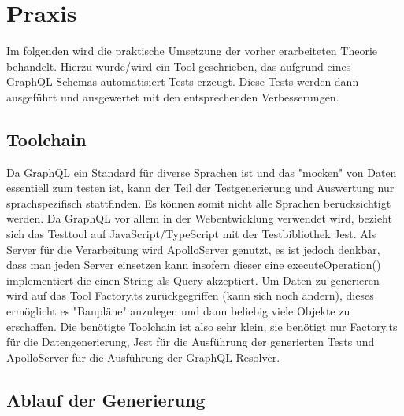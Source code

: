 \chapter{Praxis}

Im folgenden wird die praktische Umsetzung der vorher erarbeiteten Theorie behandelt.
Hierzu wurde/wird ein Tool geschrieben, das aufgrund eines GraphQL-Schemas automatisiert Tests erzeugt.
Diese Tests werden dann ausgeführt und ausgewertet mit den entsprechenden Verbesserungen.

\section{Toolchain}

Da GraphQL ein Standard für diverse Sprachen ist und das "mocken" von Daten essentiell zum testen ist, kann
der Teil der Testgenerierung und Auswertung nur sprachspezifisch stattfinden. Es können somit nicht alle
Sprachen berücksichtigt werden.
Da GraphQL vor allem in der Webentwicklung verwendet wird, bezieht sich das Testtool auf JavaScript/TypeScript
mit der Testbibliothek Jest.
Als Server für die Verarbeitung wird ApolloServer genutzt, es ist jedoch denkbar,
dass man jeden Server einsetzen kann insofern dieser eine executeOperation() implementiert die einen
String als Query akzeptiert.
Um Daten zu generieren wird auf das Tool Factory.ts zurückgegriffen (kann sich noch ändern), dieses
ermöglicht es "Baupläne" anzulegen und dann beliebig viele Objekte zu erschaffen.
Die benötigte Toolchain ist also sehr klein, sie benötigt nur Factory.ts für die Datengenerierung,
Jest für die Ausführung der generierten Tests und
ApolloServer für die Ausführung der GraphQL-Resolver.

\section{Ablauf der Generierung}

